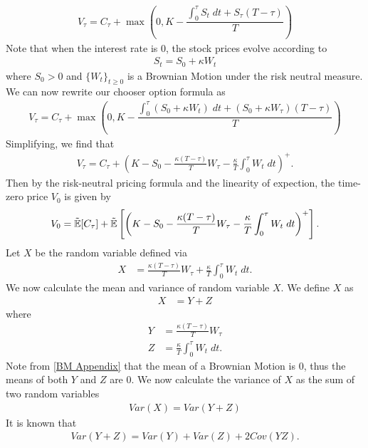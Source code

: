\documentclass[reqno]{amsart}
\begin{document}
\begin{align}
     V_\tau = C_\tau + \max(0, K - \dfrac{\int_0^\tau S_t \; dt + S_\tau (T - \tau)}{T})
\end{align}
Note that when the interest rate is $0$, the stock prices evolve according to 
\begin{align}
     S_t = S_0 + \kappa W_t
\end{align}
where $S_0 > 0$ and $\{W_t\}_{t \ge 0}$ is a Brownian Motion under the risk neutral measure.
We can now rewrite our chooser option formula as
\begin{align}
     V_\tau = C_\tau + \max(0, K - \dfrac{\int_0^\tau \left( S_0 + \kappa W_t \right) \; dt + (S_0 + \kappa W_\tau) (T - \tau)}{T})
\end{align}
Simplifying, we find that 
\begin{align}
     V_\tau = C_\tau + \left(K- S_0 - \frac{\kappa(T-\tau)}{T} W_\tau - \frac{\kappa}{T} \int_0^\tau W_t \; dt  \right)^+.
\end{align}
Then by the risk-neutral pricing formula and the linearity of expection, the time-zero price $V_0$ is given by
\begin{align} \label{eq: expect form}
     V_0 = \tilde{\mathbb{E}}[C_\tau] + \tilde{\mathbb{E}}\left[\left(K- S_0 - \frac{\kappa(T-\tau)}{T} W_\tau - \frac{\kappa}{T} \int_0^\tau W_t \; dt  \right)^+\right].
\end{align}
Let $X$ be the random variable defined via 
\begin{align}
     X &= \frac{\kappa(T-\tau)}{T} W_\tau + \frac{\kappa}{T} \int_0^\tau W_t \; dt.
\end{align}
We now calculate the mean and variance of random variable $X$.
We define $X$ as
\begin{align}
     X &= Y + Z
\end{align}
where 
\begin{align}
     Y &= \frac{\kappa(T-\tau)}{T} W_\tau\\
     Z &= \frac{\kappa}{T} \int_0^\tau W_t \; dt.
\end{align}
Note from \eqref{BM Appendix} that the mean of a Brownian Motion is $0$, thus the means of both $Y$ and $Z$ are $0$. 
We now calculate the variance of $X$ as the sum of two random variables
\begin{align}
     Var(X) = Var(Y + Z)
\end{align}
It is known that
\begin{align}
     Var(Y + Z) = Var(Y) + Var(Z) + 2Cov(YZ).
\end{align}
\end{document}
